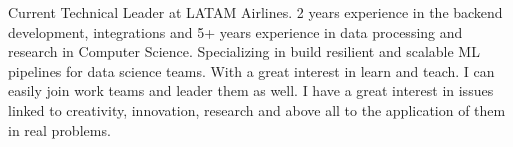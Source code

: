 

\begin{cvparagraph}

Current Technical Leader at LATAM Airlines. 2 years experience in the backend development, integrations and 5+ years experience in data processing and research in Computer Science.
Specializing in build resilient and scalable ML pipelines for data science teams. With a great interest in learn and teach. I can easily join work teams and leader them as well. I have a great interest in issues linked to creativity, innovation, research and above all to the application of them in real problems.
\end{cvparagraph}
